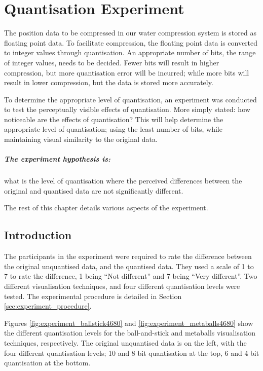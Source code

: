 \graphicspath{{./experiment/}}

\chapter{Quantisation Experiment}
\label{cha:experiment}

The position data to be compressed in our water compression system is stored as
floating point data. To facilitate compression, the floating point data is
converted to integer values through quantisation. An appropriate number of
bits, the range of integer values, needs to be decided. Fewer bits will result
in higher compression, but more quantisation error will be incurred; while more
bits will result in lower compression, but the data is stored more accurately.

To determine the appropriate level of quantisation, an experiment was conducted
to test the perceptually visible effects of quantisation. More simply stated:
how noticeable are the effects of quantisation? This will help determine the
appropriate level of quantisation; using the least number of bits, while
maintaining visual similarity to the original data.

\paragraph{The experiment hypothesis is:} what is the level of quantisation where the
perceived differences between the original and quantised data are not
significantly different.

The rest of this chapter details various aspects of the experiment.

\section{Introduction}
\label{sec:experiment_introduction}

The participants in the experiment were required to rate the difference between
the original unquantised data, and the quantised data. They used a scale of 1
to 7 to rate the difference, 1 being ``Not different'' and 7 being ``Very
different''. Two different visualisation techniques, and four different
quantisation levels were tested. The experimental procedure is detailed in
Section \ref{sec:experiment_procedure}.

Figures \ref{fig:experiment_ballstick4680} and
\ref{fig:experiment_metaballs4680} show the different quantisation levels for
the ball-and-stick and metaballs visualisation techniques, respectively. The
original unquantised data is on the left, with the four different quantisation
levels; 10 and 8 bit quantisation at the top, 6 and 4 bit quantisation at the
bottom.

